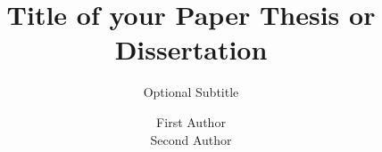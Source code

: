 \documentclass[spinewidth=5mm, british]{cover-Bram}
\title{Title of your Paper Thesis or Dissertation}
\subtitle{Optional Subtitle}
\author{First Author\\ Second Author}
\begin{document}
	
	\makeoutside
	\makeinside	
\end{document}
